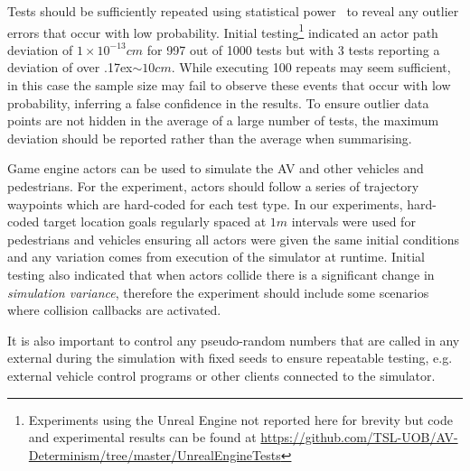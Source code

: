 \documentclass[letterpaper, 10 pt, journal, twoside]{IEEEtran}
\begin{document}
Tests should be sufficiently repeated using statistical power~\cite{cohen2013statistical} to reveal any outlier errors that occur with low probability. Initial testing\footnote{\label{note1}Experiments using the Unreal Engine not reported here for brevity but code and experimental results can be found at \url{https://github.com/TSL-UOB/AV-Determinism/tree/master/UnrealEngineTests}} indicated an actor path deviation of $1\times10^{-13} cm$ for 997 out of 1000 tests but with 3 tests reporting a deviation of over {\raise.17ex\hbox{$\scriptstyle\sim$}}$10cm$. While executing 100 repeats may seem sufficient, in this case the sample size may fail to observe these events that occur with low probability, inferring a false confidence in the results. To ensure outlier data points are not hidden in the average of a large number of tests, the maximum deviation should be reported rather than the average when summarising.

Game engine actors can be used to simulate the AV and other vehicles and pedestrians. For the experiment, actors should follow a series of trajectory waypoints which are hard-coded for each test type. In our experiments, hard-coded target location goals regularly spaced at $1m$ intervals were used for pedestrians and vehicles ensuring all actors were given the same initial conditions and any variation comes from execution of the simulator at runtime. Initial testing also indicated that when actors collide there is a significant change in \textit{simulation variance}, therefore the experiment should include some scenarios where collision callbacks are activated. 

It is also important to control any pseudo-random numbers that are called in any external during the simulation with fixed seeds to ensure repeatable testing, e.g. external vehicle control programs or other clients connected to the simulator. 



\end{document}
